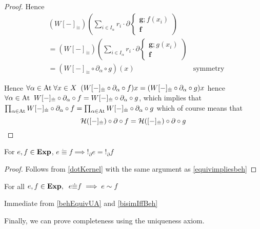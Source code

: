 \documentclass[a4paper,UKenglish,cleveref, autoref, thm-restate]{lipics-v2021}
\newcommand{\At}{\text{\upshape{At}}}
\newcommand{\Exp}{\textbf{\upshape{Exp}}}
\theoremstyle{plain}\newtheoremrep{thm}{Theorem}[section]
\begin{document}
\begin{toappendix}
\begin{proof}
			Hence
			\begin{align*}
				&(W[-]_{\dot\equiv})\left(\sum_{i \in I_\alpha} r_i\cdot \partial\begin{cases}\textbf{g};f(x_i)\\\textbf{f}\end{cases}\right)\\
				&=(W[-]_{\dot\equiv})\left(\sum_{i \in I_\alpha} r_i\cdot \partial\begin{cases}\textbf{g};g(x_i)\\\textbf{f}\end{cases}\right)\\
				&=(W[-]_{\dot\equiv} \circ \partial_\alpha \circ g)(x) & \text{symmetry}
			\end{align*}
	
			Hence $\forall \alpha \in \At\; \forall x \in X\;\; (W[-]_{\dot\equiv}\circ \partial_\alpha \circ f) x = (W[-]_{\dot\equiv}\circ \partial_\alpha \circ g) x$ hence $\forall \alpha \in \At \;\; W[-]_{\dot\equiv}\circ \partial_{\alpha} \circ f = W[-]_{\dot\equiv}\circ \partial_{\alpha} \circ g$, which implies that $\prod_{\alpha\in\At} W[-]_{\dot\equiv}\circ \partial_{\alpha} \circ f = \prod_{\alpha\in\At}W[-]_{\dot\equiv}\circ \partial_{\alpha} \circ g$ which of course means that 
			$$\mathcal{H}([-]_{\dot\equiv})\circ \partial \circ f = \mathcal{H}([-]_{\dot\equiv})\circ \partial \circ g\qedhere$$
		\end{proof}
	\end{toappendix}
	\begin{toappendix}
		\begin{cor} \label{behEquivUA}
			For $e,f \in \Exp$, $e \dot\equiv f \implies !_\partial e=!_\partial f$
		\end{cor}
		\begin{proof}
			Follows from \cref{dotKernel} with the same argument as \cref{equivimpliesbeh}
		\end{proof}
	\end{toappendix}
	
	\begin{thmrep}
		For all $e,f \in \Exp,\;\; e \dot\equiv f \implies e \sim f$
	\end{thmrep}
	\begin{appendixproof}
		Immediate from \cref{behEquivUA} and \cref{bisimIffBeh} 
	\end{appendixproof}
	
	Finally, we can prove completeness using the uniqueness axiom.
	
\end{document}
